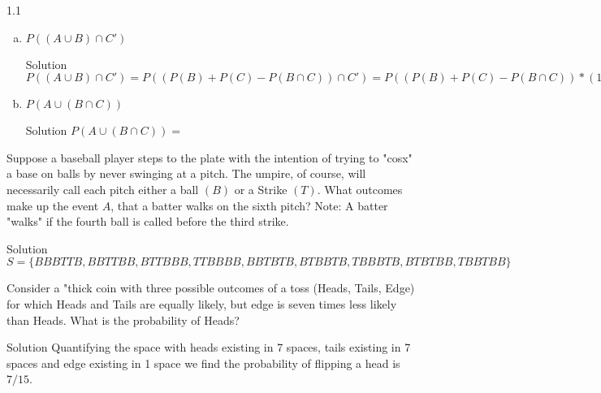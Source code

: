 \documentclass{article}
\begin{document}
\begin{spacing}{1.1}
\begin{homeworkProblem}
\begin{enumerate}[(a)]
\begin{homeworkSection}{Solution}
			$P( B \cup C) = P( B) + P( C) - P( B \cap C) = 0.50 + 0.40 - 0.20 = 0.70$
		\end{homeworkSection}
	\item $P \left( \left( A \cup B \right) \cap C' \right)$
		\begin{homeworkSection}{Solution}
			$P \left( \left( A \cup B \right) \cap C' \right) = P((P( B) + P( C) - P( B \cap C)) \cap C' )
			= P((P( B) + P( C) - P( B \cap C)) * (1 - P(C))) = 0.80 * 0.60 = 0.48$
		\end{homeworkSection}
	\item $P \left( A \cup \left( B \cap C \right) \right)$
		\begin{homeworkSection}{Solution}
			$P \left( A \cup \left( B \cap C \right) \right) = 	$

		\end{homeworkSection}	
	\end{enumerate}
\end{homeworkProblem}
\begin{homeworkProblem}
	Suppose a baseball player steps to the plate with the intention of trying to "cosx" a base on balls by never swinging at a pitch.  The umpire, of course, will necessarily call each pitch either a ball $(B)$ or a Strike $(T)$.  What outcomes make up the event $A$, that a batter walks on the sixth pitch? Note: A batter "walks" if the fourth ball is called before the third strike.
		\begin{homeworkSection}{Solution}
			$S = \{ BBBTTB, BBTTBB, BTTBBB, TTBBBB, BBTBTB, BTBBTB, TBBBTB, BTBTBB, TBBTBB \}$
		\end{homeworkSection}	
\end{homeworkProblem}
\begin{homeworkProblem}
	Consider a "thick coin with three possible outcomes of a toss (Heads, Tails, Edge) for which Heads and Tails are equally likely, but edge is seven times less likely than Heads.  What is the probability of Heads?
		\begin{homeworkSection}{Solution}
			Quantifying the space with heads existing in 7 spaces, tails existing in 7 spaces and edge existing in 1 space we find the probability of flipping a head is $7/15$.  
		\end{homeworkSection}	
\end{homeworkProblem}
\begin{homeworkProblem}

\end{homeworkProblem}
\end{spacing}
\end{document}

